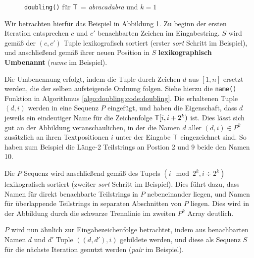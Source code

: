 \begin{figure}
\caption{\texttt{doubling()} für $\inputtext{}$ = \textit{abracadabra} und $k = 1$}
\label{algo:doubling:fig:doubling}
\end{figure}

Wir betrachten hierfür das Beispiel in Abbildung \ref{algo:doubling:fig:doubling}. Zu beginn der ersten Iteration entsprechen $c$ und $c'$ benachbarten Zeichen im Eingabestring. $S$ wird gemäß der $(c, c')$ Tuple lexikografisch sortiert (erster \textit{sort} Schritt im Beispiel), und anschließend gemäß ihrer neuen Position in $S$ \textbf{lexikographisch Umbenannt} (\textit{name} im Beispiel).

Die Umbenennung erfolgt, indem die Tuple durch Zeichen $d$ aus $[1, n]$ ersetzt werden, die der selben aufsteigende Ordnung folgen. Siehe hierzu die \texttt{name()} Funktion in Algorithmus \ref{algo:doubling:code:doubling}. Die erhaltenen Tuple $(d, i)$ werden in eine Sequenz $P$ eingefügt, und haben die Eigenschaft, dass $d$ jeweils ein eindeutiger Name für die Zeichenfolge $\inputtext{}[i, i + 2^k)$ ist. Dies lässt sich gut an der Abbildung veranschaulichen, in der die Namen $d$ aller $(d, i) \in P^k$ zusätzlich an ihren Textpositionen $i$ unter der Eingabe $\inputtext{}$ eingezeichnet sind. So haben zum Beispiel die Länge-2 Teilstrings an Postion 2 und 9 beide den Namen 10.

Die $P$ Sequenz wird anschließend gemäß des Tupels $(i \mod 2^k, i \div 2^k)$ lexikografisch sortiert (zweiter \textit{sort} Schritt im Beispiel). Dies führt dazu, dass Namen für direkt benachbarte Teilstrings in $P$ nebeneinander liegen, und Namen für überlappende Teilstrings in separaten Abschnitten von $P$ liegen. Dies wird in der Abbildung durch die schwarze Trennlinie im zweiten $P^k$ Array deutlich.

$P$ wird nun ähnlich zur Eingabezeichenfolge betrachtet, indem aus benachbarten Namen $d$ und $d'$ Tuple $((d, d'), i)$ gebildete werden, und diese als Sequenz $S$ für die nächste Iteration genutzt werden (\textit{pair} im Beispiel).

